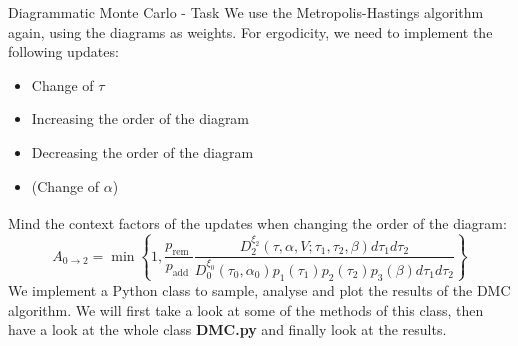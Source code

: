\documentclass[10pt,xcolor=table, aspectratio=1610]{beamer}
\newcommand{\supercitepage}[2][]{\textsuperscript{\cite[#1]{#2}}}
\begin{document}
\begin{frame}[containsverbatim]{Diagrammatic Monte Carlo - Task}
  We use the \alert{Metropolis-Hastings algorithm} again, using the diagrams as 
  weights. For ergodicity, we need to implement the following updates:
  \begin{itemize}
    \item Change of $\tau$
    \item Increasing the order of the diagram
    \item Decreasing the order of the diagram
    \item (Change of $\alpha$)
  \end{itemize}
Mind the context factors of the updates when changing the order of the diagram\supercitepage[ch. 12.3.1.2]{fehske}:
\begin{equation*}
  A_{0 \rightarrow 2}=\min \left\{1, \frac{p_{\text {rem }}}{p_{\text {add }}} \frac{D_2^{\xi_2}\left(\tau, \alpha, V ; \tau_1, \tau_2, \beta\right) d \tau_1 d \tau_2}{D_0^{\xi_0}\left(\tau_0, \alpha_0\right) p_1\left(\tau_1\right) p_2\left(\tau_2\right) p_3(\beta) d \tau_1 d \tau_2}\right\}
\end{equation*}
We implement a Python class to sample, analyse and plot the results of the DMC algorithm.
We will first take a look at some of the methods of this class, then have a look at the
whole class \textbf{DMC.py} and finally look at the results.
\end{frame}
\end{document}
